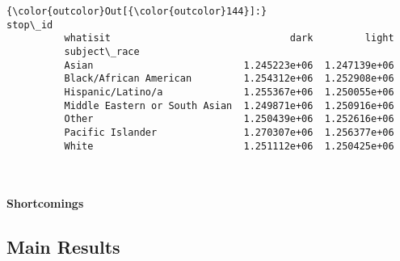 \documentclass[11pt]{article}
\begin{document}
\begin{Verbatim}[commandchars=\\\{\}]
{\color{outcolor}Out[{\color{outcolor}144}]:}                                     stop\_id              
          whatisit                               dark         light
          subject\_race                                             
          Asian                          1.245223e+06  1.247139e+06
          Black/African American         1.254312e+06  1.252908e+06
          Hispanic/Latino/a              1.255367e+06  1.250055e+06
          Middle Eastern or South Asian  1.249871e+06  1.250916e+06
          Other                          1.250439e+06  1.252616e+06
          Pacific Islander               1.270307e+06  1.256377e+06
          White                          1.251112e+06  1.250425e+06
\end{Verbatim}
            
    \begin{center}
    \end{center}
    { \hspace*{\fill} \\}
    
    \paragraph{Shortcomings}\label{shortcomings}

    \subsection{Main Results}\label{main-results}
\end{document}
